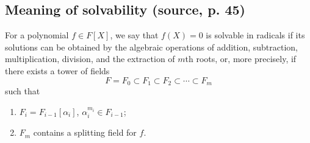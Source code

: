 
\subsection*{Meaning of solvability (source, p. 45)}
For a polynomial $f\in F[X]$, we say that $f(X)=0$ is solvable in radicals if its solutions can be obtained by the algebraic operations of addition, subtraction, multiplication, division, and the extraction of $m$th roots, or, more precisely, if there exists a tower of fields
\[
F=F_0\subset F_1\subset F_2\subset\cdots\subset F_m
\]
such that
\begin{enumerate}[label=(\alph*)]
\item $F_i=F_{i-1}[\alpha_i]$, $\alpha_i^{m_i}\in F_{i-1}$;
\item $F_m$ contains a splitting field for $f$.
\end{enumerate}

